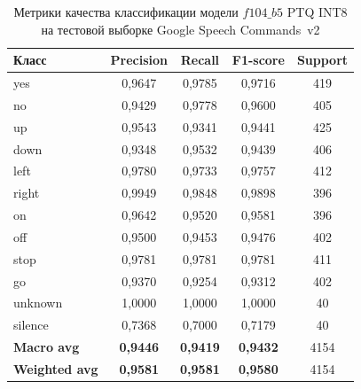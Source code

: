 \begin{table}[h!]
	\centering
	\caption{Метрики качества классификации модели $f104\_b5$ PTQ INT8 на тестовой выборке Google Speech Commands~v2}
	\label{tab:classification_metrics}
	\begin{tabular}{|l|c|c|c|c|}
		\hline
		\textbf{Класс}        & \textbf{Precision} & \textbf{Recall} & \textbf{F1-score} & \textbf{Support} \\
		\hline
		yes                   & 0,9647             & 0,9785          & 0,9716            & 419              \\ \hline
		no                    & 0,9429             & 0,9778          & 0,9600            & 405              \\ \hline
		up                    & 0,9543             & 0,9341          & 0,9441            & 425              \\ \hline
		down                  & 0,9348             & 0,9532          & 0,9439            & 406              \\ \hline
		left                  & 0,9780             & 0,9733          & 0,9757            & 412              \\ \hline
		right                 & 0,9949             & 0,9848          & 0,9898            & 396              \\ \hline
		on                    & 0,9642             & 0,9520          & 0,9581            & 396              \\ \hline
		off                   & 0,9500             & 0,9453          & 0,9476            & 402              \\ \hline
		stop                  & 0,9781             & 0,9781          & 0,9781            & 411              \\ \hline
		go                    & 0,9370             & 0,9254          & 0,9312            & 402              \\ \hline
		unknown               & 1,0000             & 1,0000          & 1,0000            & 40               \\ \hline
		silence               & 0,7368             & 0,7000          & 0,7179            & 40               \\ \hline
		\textbf{Macro avg}    & \textbf{0,9446}    & \textbf{0,9419} & \textbf{0,9432}   & 4154             \\ \hline
		\textbf{Weighted avg} & \textbf{0,9581}    & \textbf{0,9581} & \textbf{0,9580}   & 4154             \\
		\hline
	\end{tabular}
\end{table}
